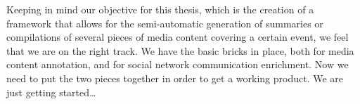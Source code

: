 \documentclass[runningheads,a4paper]{llncs}
\begin{document}
Keeping in mind our objective for this thesis, which is the creation of a framework that allows for the semi-automatic generation of summaries or compilations of several pieces of media content covering a certain event, we feel that we are on the right track. We have the basic bricks in place, both for media content annotation, and for social network communication enrichment. Now we need to put the two pieces together in order to get a working product. We are just getting started\ldots



\end{document}
